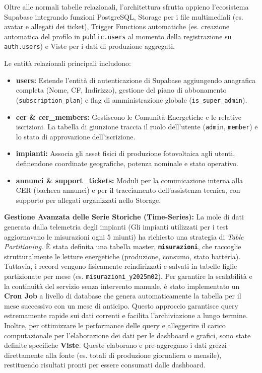 Oltre alle normali tabelle relazionali, l'architettura sfrutta appieno l'ecosistema Supabase integrando funzioni PostgreSQL, Storage per i file multimediali (es. avatar e allegati dei ticket), Trigger Functions automatiche (es. creazione automatica del profilo in \texttt{public.users} al momento della registrazione su \texttt{auth.users}) e Viste per i dati di produzione aggregati.

Le entità relazionali principali includono:
\begin{itemize}
    \item \textbf{users:} Estende l'entità di autenticazione di Supabase aggiungendo anagrafica completa (Nome, CF, Indirizzo), gestione del piano di abbonamento (\texttt{subscription\_plan}) e flag di amministrazione globale (\texttt{is\_super\_admin}).
    \item \textbf{cer \& cer\_members:} Gestiscono le Comunità Energetiche e le relative iscrizioni. La tabella di giunzione traccia il ruolo dell'utente (\texttt{admin}, \texttt{member}) e lo stato di approvazione dell'iscrizione.
    \item \textbf{impianti:} Associa gli asset fisici di produzione fotovoltaica agli utenti, definendone coordinate geografiche, potenza nominale e stato operativo.
    \item \textbf{annunci \& support\_tickets:} Moduli per la comunicazione interna alla CER (bacheca annunci) e per il tracciamento dell'assistenza tecnica, con supporto per allegati organizzati nello Storage.
\end{itemize}

\textbf{Gestione Avanzata delle Serie Storiche (Time-Series):}
La mole di dati generata dalla telemetria degli impianti (Gli impianti utilizzati per i test aggiornavano le misurazioni ogni 5 miunti) ha richiesto una strategia di \textit{Table Partitioning}. È stata definita una tabella master, \textbf{\texttt{misurazioni}}, che raccoglie strutturalmente le letture energetiche (produzione, consumo, stato batteria). Tuttavia, i record vengono fisicamente reindirizzati e salvati in tabelle figlie partizionate per mese (es. \texttt{misurazioni\_y2025m02}). 
Per garantire la scalabilità e la continuità del servizio senza intervento manuale, è stato implementato un \textbf{Cron Job} a livello di database che genera automaticamente la tabella per il mese successivo con un mese di anticipo. Questo approccio garantisce query estremamente rapide sui dati correnti e facilita l'archiviazione a lungo termine.
Inoltre, per ottimizzare le performance delle query e alleggerire il carico computazionale per l'elaborazione dei dati per le dashboard e grafici, sono state definite specifiche \textbf{Viste}. Queste elaborano e pre-aggregano i dati grezzi direttamente alla fonte (es. totali di produzione giornaliera o mensile), restituendo risultati pronti per essere consumati dalle dashboard.


